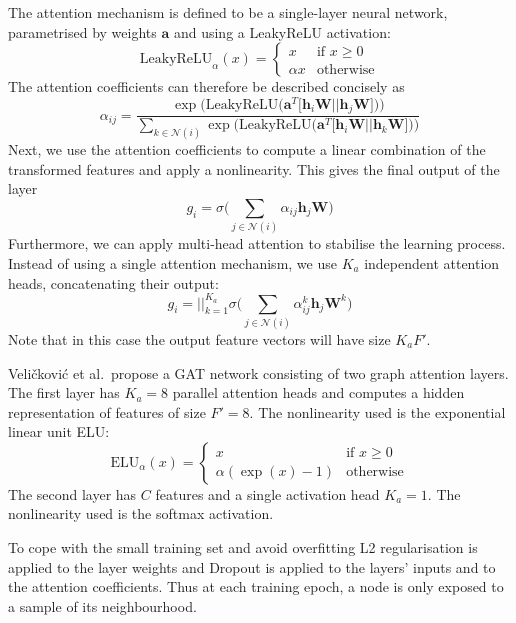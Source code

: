 \documentclass[12pt]{article}
\theoremstyle{definition}
\begin{document}
The attention mechanism is defined to be a single-layer neural network, parametrised by weights $\textbf{a}$ and using a LeakyReLU activation: 
\[
\textrm{LeakyReLU}_{\alpha}(x) = 
	\begin{cases}
		x &\text{if $x \ge 0$}\\
		\alpha x &\text{otherwise}
	\end{cases}
\]
The attention coefficients can therefore be described concisely as
\[
\alpha_{ij} = \frac{\exp \big( \textrm{LeakyReLU}\big( \textbf{a}^T \big[ \mathbf{h}_i \textbf{W} \vert\vert \mathbf{h}_j \textbf{W} \big] \big) \big)}
{
\sum_{k \in \mathcal{N}(i)} \exp \big( \textrm{LeakyReLU}\big( \textbf{a}^T \big[ \mathbf{h}_i \textbf{W} \vert\vert \mathbf{h}_k \textbf{W} \big] \big) \big)
}
\]
Next, we use the attention coefficients to compute a linear combination of the transformed features and apply a nonlinearity. This gives the final output of the layer
\[
g_i = \sigma \big( \sum_{j \in \mathcal{N}(i)} \alpha_{ij} \mathbf{h}_j \textbf{W} \big)
\]
Furthermore, we can apply multi-head attention to stabilise the learning process. Instead of using a single attention mechanism, we use $K_a$ independent attention heads, concatenating their output:
\[
g_i = {\Big\vert\Big\vert}_{k=1}^{K_a} \sigma \big( \sum_{j \in \mathcal{N}(i)} \alpha_{ij}^k \mathbf{h}_j \textbf{W}^k \big)
\]
Note that in this case the output feature vectors will have size $K_a F'$.

\bigskip

Veli{\v{c}}kovi{\'{c}} et al.\ propose a GAT network consisting of two graph attention layers. The first layer has $K_a=8$ parallel attention heads and computes a hidden representation of features of size $F'=8$. The nonlinearity used is the exponential linear unit ELU:
\[
\textrm{ELU}_{\alpha}(x) = 
	\begin{cases}
		x &\text{if $x \ge 0$}\\
		\alpha (\exp(x) - 1) &\text{otherwise}
	\end{cases}
\]
The second layer has $C$ features and a single activation head $K_a=1$. The nonlinearity used is the softmax activation.

\bigskip

To cope with the small training set and avoid overfitting L2 regularisation is applied to the layer weights and Dropout \cite{srivastava2014dropout} is applied to the layers' inputs and to the attention coefficients. Thus at each training epoch, a node is only exposed to a sample of its neighbourhood. 
\end{document}

